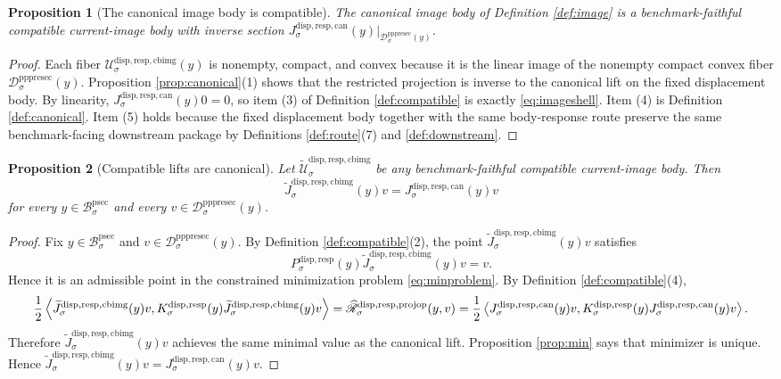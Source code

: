 \documentclass[11pt]{article}
\newcommand{\ProtoSectionBody}[1]{\mathcal B_{#1}^{\mathrm{psec}}}
\newcommand{\PrePreProtoSectionResidualBody}[1]{\mathcal D_{#1}^{\mathrm{pppresec}}}
\newcommand{\SubstrateProjection}[1]{P_{#1}^{\mathrm{disp,resp}}}
\newcommand{\SubstrateOperator}[1]{K_{#1}^{\mathrm{disp,resp}}}
\newcommand{\CanonicalLift}[1]{J_{#1}^{\mathrm{disp,resp,can}}}
\newcommand{\CoreForcedBodyResponse}[1]{\widehat{\mathscr R}_{#1}^{\mathrm{disp,resp,projop}}}
\newcommand{\CanonicalImageBody}[1]{\mathcal U_{#1}^{\mathrm{disp,resp,cbimg}}}
\newcommand{\CompatibleImageBody}[1]{\widetilde{\mathcal U}_{#1}^{\mathrm{disp,resp,cbimg}}}
\newcommand{\CompatibleImageLift}[1]{\widetilde J_{#1}^{\mathrm{disp,resp,cbimg}}}
\newtheorem{proposition}{Proposition}
\begin{document}
\begin{proposition}[The canonical image body is compatible]
\label{prop:exists}
The canonical image body of Definition \ref{def:image} is a benchmark-faithful compatible current-image body with inverse section \(\CanonicalLift{\sigma}(y)\big|_{\PrePreProtoSectionResidualBody{\sigma}(y)}\).
\end{proposition}

\begin{proof}
Each fiber \(\CanonicalImageBody{\sigma}(y)\) is nonempty, compact, and convex because it is the linear image of the nonempty compact convex fiber \(\PrePreProtoSectionResidualBody{\sigma}(y)\). Proposition \ref{prop:canonical}(1) shows that the restricted projection is inverse to the canonical lift on the fixed displacement body. By linearity, \(\CanonicalLift{\sigma}(y)0=0\), so item (3) of Definition \ref{def:compatible} is exactly \eqref{eq:imageshell}. Item (4) is Definition \ref{def:canonical}. Item (5) holds because the fixed displacement body together with the same body-response route preserve the same benchmark-facing downstream package by Definitions \ref{def:route}(7) and \ref{def:downstream}.
\end{proof}

\begin{proposition}[Compatible lifts are canonical]
\label{prop:lift}
Let \(\CompatibleImageBody{\sigma}\) be any benchmark-faithful compatible current-image body. Then
\[
\CompatibleImageLift{\sigma}(y)v
=
\CanonicalLift{\sigma}(y)v
\]
for every \(y\in\ProtoSectionBody{\sigma}\) and every \(v\in\PrePreProtoSectionResidualBody{\sigma}(y)\).
\end{proposition}

\begin{proof}
Fix \(y\in\ProtoSectionBody{\sigma}\) and \(v\in\PrePreProtoSectionResidualBody{\sigma}(y)\). By Definition \ref{def:compatible}(2), the point \(\CompatibleImageLift{\sigma}(y)v\) satisfies
\[
\SubstrateProjection{\sigma}(y)\CompatibleImageLift{\sigma}(y)v=v.
\]
Hence it is an admissible point in the constrained minimization problem \eqref{eq:minproblem}. By Definition \ref{def:compatible}(4),
\[
\frac{1}{2}
\ev{
\CompatibleImageLift{\sigma}(y)v,
\SubstrateOperator{\sigma}(y)\CompatibleImageLift{\sigma}(y)v
}
=
\CoreForcedBodyResponse{\sigma}(y,v)
=
\frac{1}{2}
\ev{
\CanonicalLift{\sigma}(y)v,
\SubstrateOperator{\sigma}(y)\CanonicalLift{\sigma}(y)v
}.
\]
Therefore \(\CompatibleImageLift{\sigma}(y)v\) achieves the same minimal value as the canonical lift. Proposition \ref{prop:min} says that minimizer is unique. Hence \(\CompatibleImageLift{\sigma}(y)v=\CanonicalLift{\sigma}(y)v\).
\end{proof}
\end{document}
